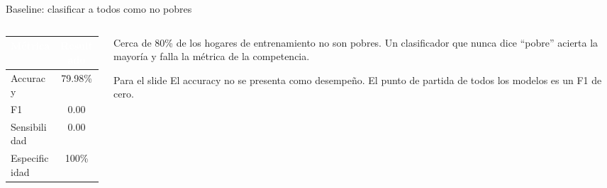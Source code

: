 \documentclass[aspectratio=169,10pt]{beamer}
\newcommand{\mejor}{\rowcolor{uniandesYellow}}
\newcommand{\hh}[1]{\cellcolor{uniandesInk}\textcolor{white}{\textbf{#1}}}
\begin{document}
\begin{frame}{Baseline: clasificar a todos como no pobres}
  \begin{columns}[c,onlytextwidth]
    \begin{column}{0.46\textwidth}
      \begin{center}
      \begin{tabular}{@{}lc@{}}
        \toprule
        \hh{Métrica} & \hh{Resultado} \\
        \midrule
        Accuracy & 79.98\% \\
        \mejor F1 & 0.00 \\
        Sensibilidad & 0.00 \\
        Especificidad & 100\% \\
        \bottomrule
      \end{tabular}
      \end{center}
    \end{column}
    \begin{column}{0.50\textwidth}
      Cerca de 80\% de los hogares de entrenamiento no son pobres. Un clasificador que nunca dice ``pobre'' acierta la mayoría y falla la métrica de la competencia.
      \vspace{0.6em}
      \begin{block}{Para el slide}
        El accuracy no se presenta como desempeño. El punto de partida de todos los modelos es un F1 de cero.
      \end{block}
    \end{column}
  \end{columns}
\end{frame}
\end{document}
